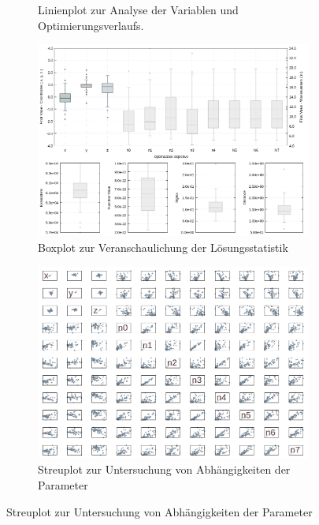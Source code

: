 \begin{landscape}
\begin{figure}[!ht]
\begin{subfigure}[t]{0.45\textheight}
	             \caption{Linienplot zur Analyse der Variablen und Optimierungsverlaufs.}
	\end{subfigure}
	\qquad
	\begin{subfigure}[t]{0.45\textheight}
		\centering
	     \includegraphics[width=\textwidth]{img/evo/boxes2089.png}
	     	    \caption{Boxplot zur Veranschaulichung der Lösungsstatistik }
	\end{subfigure}
	\qquad
	\begin{subfigure}[t]{0.45\textheight}
			\centering
	   \includegraphics[width=\textwidth]{img/evo/Scatter2089.png}
	   	       \caption{Streuplot zur Untersuchung von Abhängigkeiten der Parameter}

\end{subfigure}
\end{figure}
\end{landscape}
